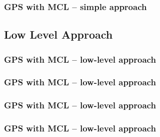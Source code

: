 \documentclass[utf8]{beamer}
\begin{document}
\begin{frame}
    \frametitle{GPS with MCL -- simple approach}
\end{frame}

\subsection{Low Level Approach}
\begin{frame}
    \frametitle{GPS with MCL -- low-level approach}
\end{frame}

\begin{frame}
    \frametitle{GPS with MCL -- low-level approach}
\end{frame}

\begin{frame}
    \frametitle{GPS with MCL -- low-level approach}
\end{frame}

\begin{frame}
    \frametitle{GPS with MCL -- low-level approach}
\end{frame}
\end{document}
